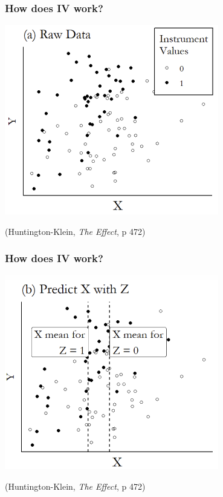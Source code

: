 \documentclass[aspectratio=43]{beamer}
\begin{document}
\begin{frame}
\frametitle{How does IV work?}
\centering

\includegraphics[width = 0.7\textwidth]{../img/ivlogic1}

{\scriptsize (Huntington-Klein, \textit{The Effect}, p 472)}

\end{frame}

\begin{frame}
\frametitle{How does IV work?}
\centering

\includegraphics[width = 0.7\textwidth]{../img/ivlogic2}

{\scriptsize (Huntington-Klein, \textit{The Effect}, p 472)}
\end{frame}
\end{document}
